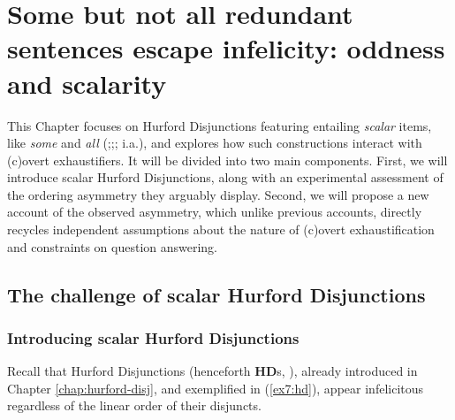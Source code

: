 \chapter[Some but not all redundant sentences escape infelicity: oddness and scalarity]{Some but not all redundant sentences escape infelicity: oddness and scalarity\footnotemark}\label{chap:scalarity}


This Chapter focuses on Hurford Disjunctions %
featuring entailing \textit{scalar} items, like \textit{some} and \textit{all} (;;; i.a.), and explores how such constructions interact with (c)overt exhaustifiers. It will be divided into two main components. First, we will introduce scalar Hurford Disjunctions, along with an experimental assessment of the ordering asymmetry they arguably display. Second, we will propose a new account of the observed asymmetry, which unlike previous accounts, directly recycles independent assumptions about the nature of (c)overt exhaustification and constraints on question answering. %

\section{The challenge of scalar Hurford Disjunctions}\label{sec7:asym-exp}

\subsection{Introducing scalar Hurford Disjunctions}
Recall that Hurford Disjunctions (henceforth \textbf{HD}s, ), already introduced in Chapter \ref{chap:hurford-disj}, and exemplified in (\ref{ex7:hd}), appear infelicitous regardless of the linear order of their disjuncts. 


